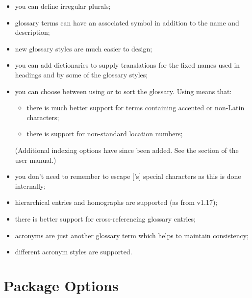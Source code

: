 \documentclass[titlepage=false,oneside,
 fontsize=12pt,captions=tableheading]{scrarticle}
\begin{document}
\begin{itemize}
\item you can define irregular plurals;

\item glossary terms can have an associated symbol in addition
to the name and description;

\item new glossary styles are much easier to design;

\item you can add dictionaries to supply translations for the
fixed names used in headings and by some of the glossary styles;

\item you can choose between using  or  to
sort the glossary. Using  means that:

  \begin{itemize}
  \item there is much better support for terms containing accented 
  or non-Latin characters;

  \item there is support for non-standard location numbers;
  \end{itemize}

(Additional indexing options have since been added. See
the  section
of the  user manual.)

\item you don't need to remember to escape ['s]
special characters as this is done internally;

\item hierarchical entries and homographs are supported (as
from v1.17);

\item there is better support for cross-referencing glossary entries;

\item acronyms are just another glossary term which helps to
maintain consistency;

\item different acronym styles are supported.

\end{itemize}

\section{Package Options}
\end{document}
